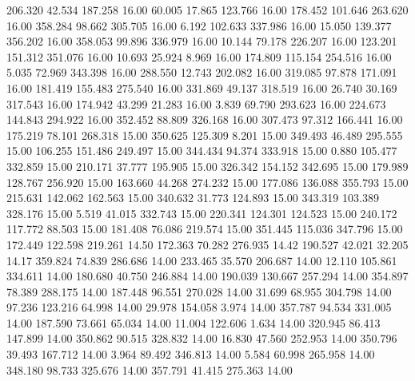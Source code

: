  206.320   42.534  187.258        16.00
  60.005   17.865  123.766        16.00
 178.452  101.646  263.620        16.00
 358.284   98.662  305.705        16.00
   6.192  102.633  337.986        16.00
  15.050  139.377  356.202        16.00
 358.053   99.896  336.979        16.00
  10.144   79.178  226.207        16.00
 123.201  151.312  351.076        16.00
  10.693   25.924    8.969        16.00
 174.809  115.154  254.516        16.00
   5.035   72.969  343.398        16.00
 288.550   12.743  202.082        16.00
 319.085   97.878  171.091        16.00
 181.419  155.483  275.540        16.00
 331.869   49.137  318.519        16.00
  26.740   30.169  317.543        16.00
 174.942   43.299   21.283        16.00
   3.839   69.790  293.623        16.00
 224.673  144.843  294.922        16.00
 352.452   88.809  326.168        16.00
 307.473   97.312  166.441        16.00
 175.219   78.101  268.318        15.00
 350.625  125.309    8.201        15.00
 349.493   46.489  295.555        15.00
 106.255  151.486  249.497        15.00
 344.434   94.374  333.918        15.00
   0.880  105.477  332.859        15.00
 210.171   37.777  195.905        15.00
 326.342  154.152  342.695        15.00
 179.989  128.767  256.920        15.00
 163.660   44.268  274.232        15.00
 177.086  136.088  355.793        15.00
 215.631  142.062  162.563        15.00
 340.632   31.773  124.893        15.00
 343.319  103.389  328.176        15.00
   5.519   41.015  332.743        15.00
 220.341  124.301  124.523        15.00
 240.172  117.772   88.503        15.00
 181.408   76.086  219.574        15.00
 351.445  115.036  347.796        15.00
 172.449  122.598  219.261        14.50
 172.363   70.282  276.935        14.42
 190.527   42.021   32.205        14.17
 359.824   74.839  286.686        14.00
 233.465   35.570  206.687        14.00
  12.110  105.861  334.611        14.00
 180.680   40.750  246.884        14.00
 190.039  130.667  257.294        14.00
 354.897   78.389  288.175        14.00
 187.448   96.551  270.028        14.00
  31.699   68.955  304.798        14.00
  97.236  123.216   64.998        14.00
  29.978  154.058    3.974        14.00
 357.787   94.534  331.005        14.00
 187.590   73.661   65.034        14.00
  11.004  122.606    1.634        14.00
 320.945   86.413  147.899        14.00
 350.862   90.515  328.832        14.00
  16.830   47.560  252.953        14.00
 350.796   39.493  167.712        14.00
   3.964   89.492  346.813        14.00
   5.584   60.998  265.958        14.00
 348.180   98.733  325.676        14.00
 357.791   41.415  275.363        14.00
